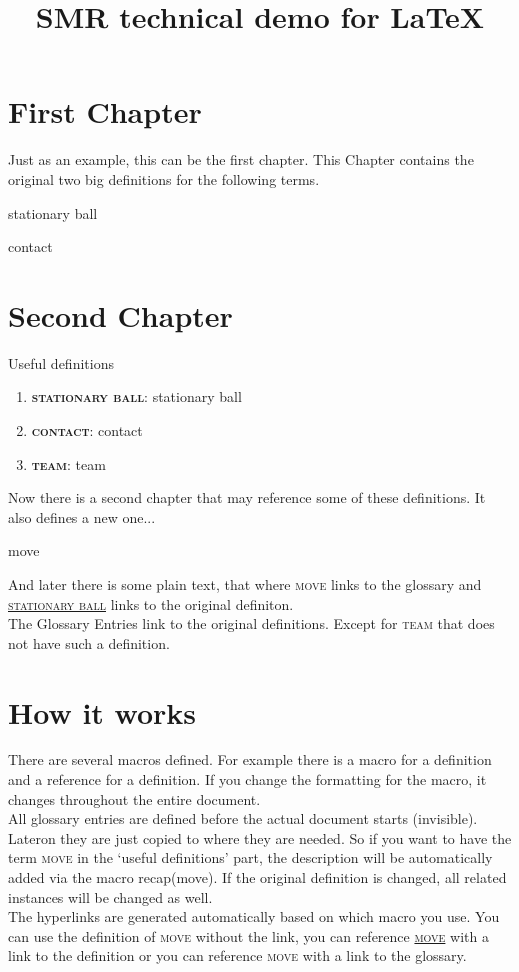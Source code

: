 \documentclass[fontsize=11pt, paper=a4]{report}
\newcommand{\refformat}[1]{{\sffamily \textsc{#1}}}			 %
\newcommand{\defformat}[1]{{\textbf{\refformat{#1}}}}%
\newcommand{\dtterm}[1]{
\begin{Definition}[name=\defformat{#1}]
	\label{d:#1}
	 \glsdesc*{#1} %
\end{Definition}
}
\newcommand{\dref}[1]{\refformat{\hyperref[d:#1]{#1}}}
\newcommand{\tref}[1]{\refformat{{#1}}} %
\newcommand{\gref}[1]{\refformat{\gls{#1}}} %
\newcommand{\tterm}[1]{%
	\defformat{#1}: \glsdesc*{#1} %
}
\newcommand{\recap}[1]{\item{\tterm{#1}}}
\begin{document}
\sffamily %


\title{SMR technical demo for \LaTeX}
\maketitle

\tableofcontents

\pagestyle{plain}%

\chapter{First Chapter}
Just as an example, this can be the first chapter. This Chapter contains the original two big definitions for the following terms.
\dtterm{stationary ball}
\dtterm{contact}

\newpage

\chapter{Second Chapter}
Useful definitions
\begin{enumerate}
	\recap{stationary ball}
	\recap{contact}
	\recap{team}
\end{enumerate}
Now there is a second chapter that may reference some of these definitions. It also defines a new one...
\dtterm{move}
 And later there is some plain text, that where \gref{move} links to the glossary and \dref{stationary ball} links to the original definiton.\\
 The Glossary Entries link to the original definitions. Except for \gref{team} that does not have such a definition.

\chapter{How it works}
There are several macros defined. For example there is a macro for a definition and a reference for a definition. If you change the formatting for the macro, it changes throughout the entire document.\\
All glossary entries are defined before the actual document starts (invisible). Lateron they are just copied to where they are needed. So if you want to have the term \tref{move} in the `useful definitions' part, the description will be automatically added via the macro recap(move). If the original definition is changed, all related instances will be changed as well.\\
The hyperlinks are generated automatically based on which macro you use. You can use the definition of \tref{move} without the link, you can reference \dref{move} with a link to the definition or you can reference \gref{move} with a link to the glossary.

\clearpage
\printglossary[title=Definitions, toctitle=List of terms]%
\end{document}
